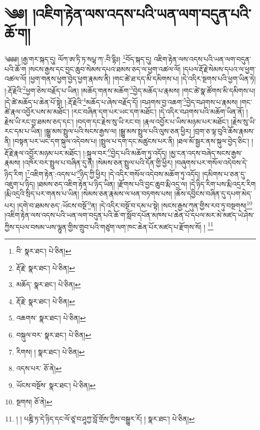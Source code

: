 \setcounter{footnote}{0} 
\chapter{༄༅། །འཇིག་རྟེན་ལས་འདས་པའི་ཡན་ལག་བདུན་པའི་ཆོ་ག།}༄༅༅། །རྒྱ་གར་སྐད་དུ། ལོཀ་ཨ་ཏི་ཏ་སཔྟ་ཀ་:བི་དྷིཿ། \footnote{བི་  སྣར་ཐང་།  པེ་ཅིན། }བོད་སྐད་དུ། འཇིག་རྟེན་ལས་འདས་པའི་ཡན་ལག་བདུན་པའི་ཆོ་ག །སངས་རྒྱས་དང་བྱང་ཆུབ་སེམས་དཔའ་ཐམས་ཅད་ལ་ཕྱག་འཚལ་ལོ། །དཔལ་རྡོ་རྗེ་སེམས་དཔའ་ལ་ཕྱག་འཚལ་ལོ། །ཕྱག་གནས་ཕྱག་བྱེད་ཕྱག་རྣམས་ནི། །གང་ཚེ་ཐ་དད་མི་དམིགས་པ། །དེ་འདིར་སྔགས་པའི་ཕྱག་ཡིན་ཏེ། །:རྡོ་རྗེའི་\footnote{རྡོ་རྗེ་  སྣར་ཐང་།  པེ་ཅིན། }ཕྱག་ཅེས་བརྗོད་པ་ཡིན། །མཆོད་གནས་མཆོག་\footnote{མཆོད་  སྣར་ཐང་།  པེ་ཅིན། }བྱེད་མཆོད་པ་རྣམས། །གང་ཚེ་སྣ་ཚོགས་མི་དམིགས་པ། །དེ་ཚེ་མཆོད་པ་ཆེན་པོ་སྟེ། །:རྡོ་རྗེའི་\footnote{རྡོ་རྗེ་  སྣར་ཐང་།  པེ་ཅིན། }མཆོད་པ་ཞེས་བརྗོད་དོ། །བཤགས་བྱ་འཆག་\footnote{འཆགས་  སྣར་ཐང་།  པེ་ཅིན། }བྱེད་བཤགས་པ་རྣམས། །གང་ཚེ་རྣལ་འབྱོར་པས་མ་མཐོང་། །རང་བཞིན་དག་པར་ཡང་དག་མཐོང་། །དེ་འདིར་བཤགས་པའི་མཆོག་ཡིན་ནོ། །རྗེས་ཡི་རང་བྱ་ཐམས་ཅད་དང་། །བདག་དང་རྗེས་སུ་ཡི་རང་བ། །རྣལ་འབྱོར་པ་ཡིས་མཉམ་པར་མཐོང་། །རྗེས་སུ་ཡི་རང་དམ་པ་ཡིན། །སྒྱུ་མས་སྤྲུལ་པའི་སངས་རྒྱས་ལ། །སྒྱུ་མས་སྤྲུལ་པའི་ལུས་ཅན་ཕྱིར། །བྲག་ཅ་ལྟ་བུའི་ཆོས་རྣམས་ནི། །བསྟན་པར་ཡང་དག་སྐུལ་འདེབས་པ། །སྤྲུལ་པ་དག་དང་མཚུངས་པར་ནི། །ཐལ་མོ་སྦྱར་ནས་སྐུལ་བྱེད་ཅིང་། །རྡོ་རྗེ་རྣལ་འབྱོར་མཉམ་པར་མཐོང་། །:སྐུལ་བར་\footnote{བསྐུལ་བར་  སྣར་ཐང་།  པེ་ཅིན། }བྱེད་པའི་མཆོག་ཏུ་འདོད། །མྱ་ངན་འདས་བཞེད་སངས་རྒྱས་རྣམས། །འཁོར་བར་སྤྲུལ་པ་བཞིན་དུ་ནི། །སེམས་ཅན་སྤྲུལ་པའི་དོན་གྱི་ཕྱིར། །བཞུགས་པར་གསོལ་འདེབས་དེ་ཉིད་རིག །\footnote{རིགས། །  སྣར་ཐང་།  པེ་ཅིན། }འཇིག་རྟེན་:འདས་པ་\footnote{འདས་པར་  ཅོ་ནེ། }ཉིད་ཀྱི་ཕྱིར། །དེ་འདིར་གསོལ་འདེབས་མཆོག་ཏུ་འདོད། །དམིགས་པ་ཅན་དུ་འཇུག་པ་ཉིད། །ཐམས་ཅད་འཇིག་རྟེན་པ་ཉིད་ཡིན། །རྫོགས་པའི་བྱང་ཆུབ་རྨི་འདྲ་ལ། །དེ་ཉིད་རིག་པས་རྨི་འདྲར་རིག །རྨི་འདྲའི་སྲིད་པར་གནས་པ་ཡིན། །སེམས་ཅན་རྣམས་ལ་ཕན་བཏགས་པས། །ཆོས་དབྱིངས་བཞིན་དུ་དཔག་མེད་པར། །དགེ་བ་ཐམས་ཅད་:ཡོངས་བསྔོ་\footnote{ཡོངས་བསྔོས་  སྣར་ཐང་།  པེ་ཅིན། }ན། །དེ་འདིར་བསྔོ་བ་དམ་པ་སྟེ། །སངས་རྒྱས་ཀུན་གྱིས་རབ་ཏུ་བསྔགས།\footnote{སྔགས།  ཅོ་ནེ། } །འཇིག་རྟེན་ལས་འདས་པའི་ཡན་ལག་བདུན་པའི་ཆོ་ག་སློབ་དཔོན་མཁས་པ་ཆེན་པོ་དཔལ་མར་མེ་མཛད་ཡེ་ཤེས་ཀྱིས་དཔལ་བསམ་ཡས་ལྷུན་གྱིས་གྲུབ་པའི་གཙུག་ལག་ཁང་ཆེན་པོར་མཛད་པ་རྫོགས་སོ། ། \footnote{། ། པཎྜི་ཏ་དེ་ཉིད་དང་ལོ་ཙཱ་བ་ཤཱཀྱ་བློ་གྲོས་ཀྱིས་བསྒྱུར་རོ། །  སྣར་ཐང་།  པེ་ཅིན། }
